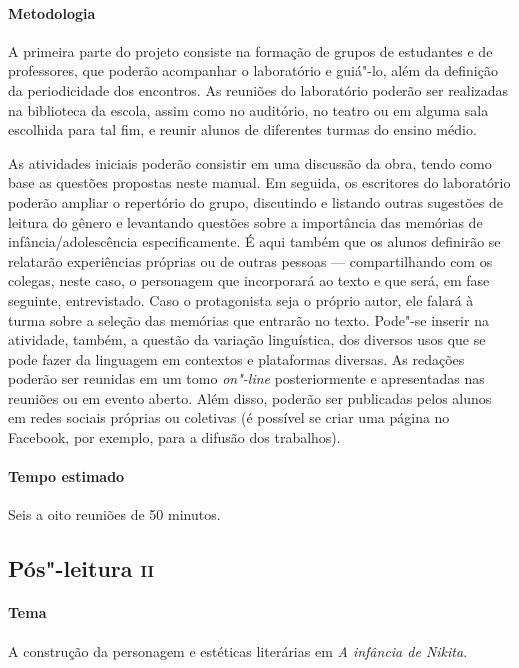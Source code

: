 \documentclass{article}
\begin{document}
\paragraph{Metodologia}
A primeira parte do projeto consiste na formação de grupos de estudantes
e de professores, que poderão acompanhar o laboratório e guiá"-lo, além
da definição da periodicidade dos encontros. As reuniões do laboratório
poderão ser realizadas na biblioteca da escola, assim como no auditório,
no teatro ou em alguma sala escolhida para tal fim, e reunir alunos de
diferentes turmas do ensino médio.

As atividades iniciais poderão consistir em uma discussão da obra, tendo
como base as questões propostas neste manual. Em seguida, os escritores
do laboratório poderão ampliar o repertório do grupo, discutindo e
listando outras sugestões de leitura do gênero e levantando questões
sobre a importância das memórias de infância/adolescência
especificamente. É aqui também que os alunos definirão se relatarão
experiências próprias ou de outras pessoas --- compartilhando com os
colegas, neste caso, o personagem que incorporará ao texto e que será,
em fase seguinte, entrevistado. Caso o protagonista seja o próprio
autor, ele falará à turma sobre a seleção das memórias que entrarão no
texto. Pode"-se inserir na atividade, também, a questão da variação
linguística, dos diversos usos que se pode fazer da linguagem em
contextos e plataformas diversas. As redações poderão ser reunidas em um
tomo \emph{on"-line} posteriormente e apresentadas nas reuniões ou em
evento aberto. Além disso, poderão ser publicadas pelos alunos em redes
sociais próprias ou coletivas (é possível se criar uma página no
Facebook, por exemplo, para a difusão dos trabalhos).

\paragraph{Tempo estimado} Seis a oito reuniões de 50 minutos.

\subsection{Pós"-leitura \textsc{ii}}

\paragraph{Tema} A construção da personagem e estéticas literárias em \emph{A infância de Nikita}.
\end{document}
